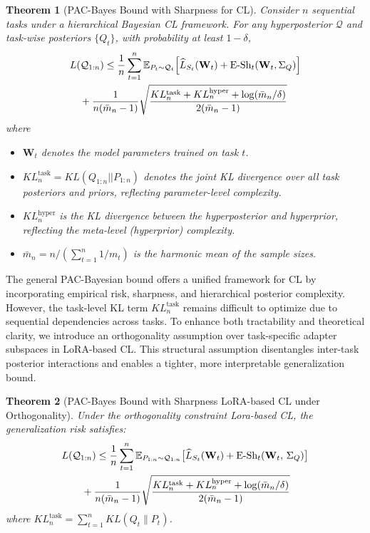 \documentclass[letterpaper]{article} %
\newtheorem{theorem}{Theorem}
\begin{document}
\begin{theorem}[PAC-Bayes Bound with Sharpness for CL]
\label{thm:general-pacbayes}
Consider $n$ sequential tasks under a hierarchical Bayesian CL framework. For any hyperposterior $\mathcal{Q}$ and task-wise posteriors $\{Q_t\}$, with probability at least $1-\delta$,
\begin{align}
& L(\mathcal{Q}_{1:n}) \leq \frac{1}{n} \sum_{t=1}^n \mathbb{E}_{P_{t} \sim \mathcal{Q}_{t}} \Big[ \widehat{L}_{S_t}(\mathbf{W}_t) 
+ {\mathrm{E\text{-}Sh}}_t(\mathbf{W}_t, \Sigma_Q) \Big] \notag\\
& \quad  +\frac{1}{n(\bar{m}_n-1)} \sqrt{
\frac{
KL^{\text{task}}_n + KL^{\text{hyper}}_n + \log(\bar{m}_n/\delta)
}{2(\bar{m}_n-1)}
}
\end{align}
where
\begin{itemize}
\item $\mathbf{W}_t$ denotes the model parameters trained on task $t$.
\item $KL^{\text{task}}_n = KL(Q_{1:n}||P_{1:n})$ denotes the joint KL divergence over all task posteriors and priors, reflecting parameter-level complexity.
\item $KL^{\text{hyper}}_n$ is the KL divergence between the hyperposterior and hyperprior, reflecting the meta-level (hyperprior) complexity. 
\item $\bar{m}_n = n / (\sum_{t=1}^n 1/m_t)$ is the harmonic mean of the sample sizes.
\end{itemize}
\end{theorem}

The general PAC-Bayesian bound offers a unified framework for CL by incorporating empirical risk, sharpness, and hierarchical posterior complexity. However, the task-level KL term $KL^{\text{task}}_n$ remains difficult to optimize due to sequential dependencies across tasks.
To enhance both tractability and theoretical clarity, we introduce an orthogonality assumption over task-specific adapter subspaces in LoRA-based CL. This structural assumption disentangles inter-task posterior interactions and enables a tighter, more interpretable generalization bound.


\begin{theorem}[PAC-Bayes Bound with Sharpness LoRA-based CL under Orthogonality]
Under the orthogonality constraint Lora-based CL, the generalization risk satisfies:
\begin{align}
      &  L(\mathcal{Q}_{1:n}) \leq  \frac{1}{n} \sum_{t=1}^{n}
        \mathbb{E}_{P_{1:n} \sim \mathcal{Q}_{1:n}}\big[
            \widehat{L}_{S_t}(\mathbf{W}_{t}) \notag
 + \text{E-Sh}_t(\mathbf{W}_{t} ,\, \Sigma_Q)
        \big] \notag\\
&  \qquad + \frac{1 }{n(\bar{m}_n - 1)}\sqrt{
            \frac{KL_{n}^{\text{task}} + KL_{n}^{\text{hyper}} +\log(\bar{m}_{n}/\delta)}{2(\bar{m}_{n} - 1)}
        }
\end{align}
where $KL^{\text{task}}_n = \sum_{t=1}^n KL(Q_t \| P_t) $.
\end{theorem}
\end{document}
